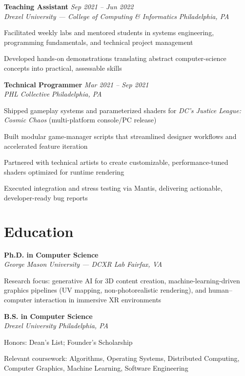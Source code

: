 \documentclass[letterpaper,10pt]{article}
\newcommand{\role}[4]{%
  \textbf{#1} \hfill \textit{#3}\\[-1pt]
  \textit{#2} \hfill \textit{#4}\par\vspace{2pt}
}
\newcommand{\education}[4]{%
  \textbf{#1} \hfill \textit{#3}\\[-1pt]
  \textit{#2} \hfill \textit{#4}\par\vspace{2pt}
}
\begin{document}
\role{Teaching Assistant}{Drexel University --- College of Computing \& Informatics}{Sep 2021 -- Jun 2022}{Philadelphia, PA}
\begin{tightitemize}
  \item Facilitated weekly labs and mentored students in systems engineering, programming fundamentals, and technical project management
  \item Developed hands-on demonstrations translating abstract computer-science concepts into practical, assessable skills
\end{tightitemize}

\role{Technical Programmer}{PHL Collective}{Mar 2021 -- Sep 2021}{Philadelphia, PA}
\begin{tightitemize}
  \item Shipped gameplay systems and parameterized shaders for \textit{DC's Justice League: Cosmic Chaos} (multi-platform console/PC release)
  \item Built modular game-manager scripts that streamlined designer workflows and accelerated feature iteration
  \item Partnered with technical artists to create customizable, performance-tuned shaders optimized for runtime rendering
  \item Executed integration and stress testing via Mantis, delivering actionable, developer-ready bug reports
\end{tightitemize}

\section*{Education}
\education{Ph.D. in Computer Science}{George Mason University --- DCXR Lab}{}{Fairfax, VA}
\begin{tightitemize}
  \item Research focus: generative AI for 3D content creation, machine-learning-driven graphics pipelines (UV mapping, non-photorealistic rendering), and human--computer interaction in immersive XR environments
\end{tightitemize}

\education{B.S. in Computer Science}{Drexel University}{}{Philadelphia, PA}
\begin{tightitemize}
  \item Honors: Dean's List; Founder's Scholarship
  \item Relevant coursework: Algorithms, Operating Systems, Distributed Computing, Computer Graphics, Machine Learning, Software Engineering
\end{tightitemize}
\end{document}
